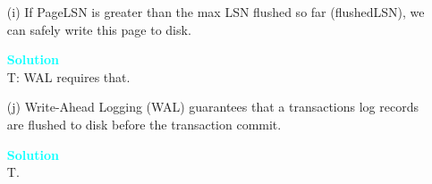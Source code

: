 \documentclass[10pt]{article}
\newenvironment{solution}
    { \begin{mdframed}[backgroundcolor=gray!10] \textcolor{cyan}{\textbf{Solution}} \\}
    {  \end{mdframed}}
\begin{document}
\begin{enumerate}
\begin{itemize}
		            \begin{solution}
			            F: The page could have been updated and flushed from the buffer pool between the last
			            checkpoint and time of crash. The flushed page would have a pageLSN from its most recent update, which is after the recLSN in the checkpoint.
		            \end{solution}
		      \item[(i)] If PageLSN is greater than the max LSN flushed so far (flushedLSN), we can safely write this page to disk.
		            \begin{solution}
			            T: WAL requires that.
		            \end{solution}
		      \item[(j)] Write-Ahead Logging (WAL) guarantees that a transactions log records are flushed to disk before the transaction commit.
		            \begin{solution}
			            T.
		            \end{solution}
	      \end{itemize}


\end{enumerate}
\end{document}
